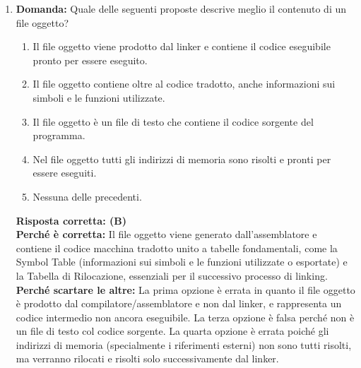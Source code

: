 \documentclass[12pt, a4paper]{article}
\begin{document}
\begin{enumerate}
    \item \textbf{Domanda:} Quale delle seguenti proposte descrive meglio il contenuto di un file oggetto?
    \begin{enumerate}[label=(\Alph*)]
        \item Il file oggetto viene prodotto dal linker e contiene il codice eseguibile pronto per essere eseguito.
        \item Il file oggetto contiene oltre al codice tradotto, anche informazioni sui simboli e le funzioni utilizzate.
        \item Il file oggetto è un file di testo che contiene il codice sorgente del programma.
        \item Nel file oggetto tutti gli indirizzi di memoria sono risolti e pronti per essere eseguiti.
        \item Nessuna delle precedenti.
    \end{enumerate}
    \textbf{Risposta corretta: (B)} \\
    \textbf{Perché è corretta:} Il file oggetto viene generato dall'assemblatore e contiene il codice macchina tradotto unito a tabelle fondamentali, come la Symbol Table (informazioni sui simboli e le funzioni utilizzate o esportate) e la Tabella di Rilocazione, essenziali per il successivo processo di linking. \\
    \textbf{Perché scartare le altre:} La prima opzione è errata in quanto il file oggetto è prodotto dal compilatore/assemblatore e non dal linker, e rappresenta un codice intermedio non ancora eseguibile. La terza opzione è falsa perché non è un file di testo col codice sorgente. La quarta opzione è errata poiché gli indirizzi di memoria (specialmente i riferimenti esterni) non sono tutti risolti, ma verranno rilocati e risolti solo successivamente dal linker.

\newpage


\end{enumerate}
\end{document}

